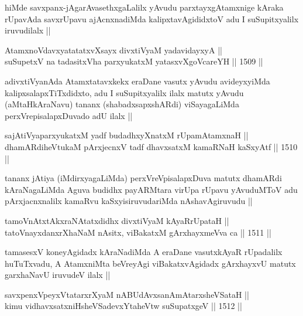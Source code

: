 \begin{artha}
hiMde savxpanx-jAgarAvasethxgaLalilx yAvudu parxtayxgAtamxnige kAraka rUpavAda savxrUpavu ajAcnxnadiMda kalipxtavAgididxtoV adu I suSupitxyalilx iruvudilalx ||
\end{artha}


\begin{shl}
AtamxnoV\s davxyatatatxvXsayx divxtiVyaM yadavidayxyA ||  \\
suSupetxV na tadasitxVha parxyukatxM yatasxvXgoVcareYH ||  1509 ||  
\end{shl}

\begin{artha}
adivxtiVyanAda Atamxtatavxkekx eraDane vasutx yAvudu avideyxyiMda kalipxsalapxTiTxdidxto, adu I suSupitxyalilx ilalx matutx yAvudu (aMtaHkAraNavu) tananx (shabadxsapxshARdi) viSayagaLiMda perxVrepisalapxDuvado adU ilalx ||
\end{artha}

\begin{shl}
sajAtiVyaparxyukatxM yadf budadhxyXnatxM rUpamAtamxnaH || \\
dhamARdiheVtukaM pArxjecnxV tadf dhavxsatxM kamaRNaH kaSxyAtf ||  1510 || 
\end{shl}

\begin{artha}
tananx jAtiya (iMdirxyagaLiMda) perxVreVpisalapxDuva matutx dhamARdi kAraNagaLiMda Aguva budidhx payARMtara virUpa rUpavu yAvuduMToV adu pArxjacnxnalilx kamaRvu kaSxyisiruvudariMda nAshavAgiruvudu ||
\end{artha}

\begin{shl}
tamoVnAtxtAkxraNAtatxdidhx divxtiVyaM kAyaRrUpataH || \\
tatoV\s nayxdanxrXhaNaM nAsitx, viBakatxM gArxhayxmeVva ca ||  1511 ||  
\end{shl}

\begin{artha}
tamasesxV koneyAgidadx kAraNadiMda A eraDane vasutxkAyaR rUpadalilx huTuTxvadu, A AtamxniMta beVreyAgi viBakatxvAgidadx gArxhayxvU matutx garxhaNavU iruvudeV ilalx ||
\end{artha}

\begin{shl}
savxpenxV\s peyxVtatarxrXyaM nABUdAvxsanAmAtarxsheVSataH ||  \\
kimu vidhavxsatxniHsheVSadevxYtaheVtw suSupatxgeV ||  1512 ||  
\end{shl}

